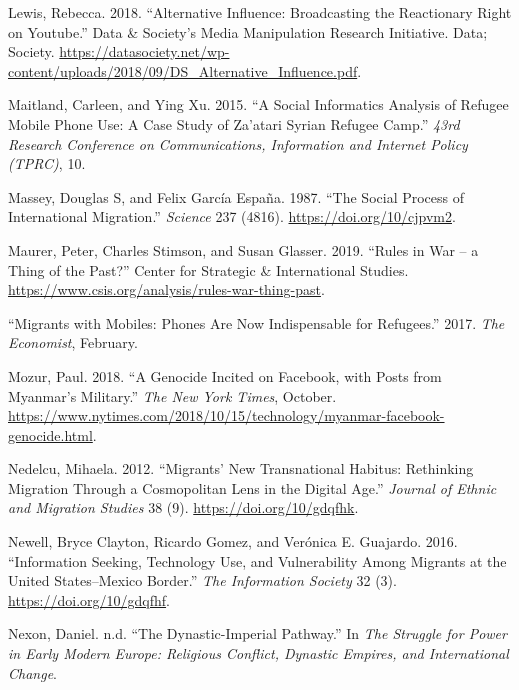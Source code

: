 \documentclass[
]{article}
\newlength{\cslhangindent}
\newenvironment{cslreferences}%
  {\setlength{\parindent}{0pt}%
  \everypar{\setlength{\hangindent}{\cslhangindent}}\ignorespaces}%
  {\par}
\begin{document}
\begin{cslreferences}
\leavevmode\hypertarget{ref-Lewis2018Alternative}{}%
Lewis, Rebecca. 2018. ``Alternative Influence: Broadcasting the
Reactionary Right on Youtube.'' Data \& Society's Media Manipulation
Research Initiative. Data; Society.
\url{https://datasociety.net/wp-content/uploads/2018/09/DS_Alternative_Influence.pdf}.

\leavevmode\hypertarget{ref-Maitland2015Social}{}%
Maitland, Carleen, and Ying Xu. 2015. ``A Social Informatics Analysis of
Refugee Mobile Phone Use: A Case Study of Za'atari Syrian Refugee
Camp.'' \emph{43rd Research Conference on Communications, Information
and Internet Policy (TPRC)}, 10.

\leavevmode\hypertarget{ref-Massey1987social}{}%
Massey, Douglas S, and Felix García España. 1987. ``The Social Process
of International Migration.'' \emph{Science} 237 (4816).
\url{https://doi.org/10/cjpvm2}.

\leavevmode\hypertarget{ref-PeterMaurer2019Rules}{}%
Maurer, Peter, Charles Stimson, and Susan Glasser. 2019. ``Rules in War
-- a Thing of the Past?'' Center for Strategic \& International Studies.
\url{https://www.csis.org/analysis/rules-war-thing-past}.

\leavevmode\hypertarget{ref-2017Migrants}{}%
``Migrants with Mobiles: Phones Are Now Indispensable for Refugees.''
2017. \emph{The Economist}, February.

\leavevmode\hypertarget{ref-Mozur2018Genocide}{}%
Mozur, Paul. 2018. ``A Genocide Incited on Facebook, with Posts from
Myanmar's Military.'' \emph{The New York Times}, October.
\url{https://www.nytimes.com/2018/10/15/technology/myanmar-facebook-genocide.html}.

\leavevmode\hypertarget{ref-Nedelcu2012Migrants}{}%
Nedelcu, Mihaela. 2012. ``Migrants' New Transnational Habitus:
Rethinking Migration Through a Cosmopolitan Lens in the Digital Age.''
\emph{Journal of Ethnic and Migration Studies} 38 (9).
\url{https://doi.org/10/gdqfhk}.

\leavevmode\hypertarget{ref-Newell2016Information}{}%
Newell, Bryce Clayton, Ricardo Gomez, and Verónica E. Guajardo. 2016.
``Information Seeking, Technology Use, and Vulnerability Among Migrants
at the United States--Mexico Border.'' \emph{The Information Society} 32
(3). \url{https://doi.org/10/gdqfhf}.

\leavevmode\hypertarget{ref-NexonDynastic-Imperial}{}%
Nexon, Daniel. n.d. ``The Dynastic-Imperial Pathway.'' In \emph{The
Struggle for Power in Early Modern Europe: Religious Conflict, Dynastic
Empires, and International Change}.


\end{cslreferences}
\end{document}
